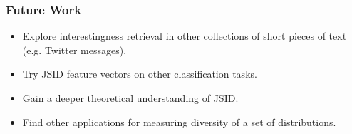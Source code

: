 \documentclass{beamer}
\begin{document}
\begin{frame}
\frametitle{Future Work}
\begin{itemize}
\item Explore interestingness retrieval in other collections of short pieces of
  text (e.g. Twitter messages).
\item Try JSID feature vectors on other classification tasks.
\item Gain a deeper theoretical understanding of JSID.
\item Find other applications for measuring diversity of a set of
  distributions.
\end{itemize}
\end{frame}

\begin{frame}


\end{frame}
\end{document}
